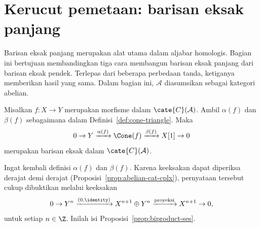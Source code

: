 
\section{Kerucut pemetaan: barisan eksak panjang}\label{sec:cone-vs-long-exact-sequence}
\hypertarget{o014.aljabr2.chapter3.mapping-cone-and-long-exact-sequences}{ }

Barisan eksak panjang merupakan alat utama dalam aljabar homologis. Bagian ini
bertujuan membandingkan tiga cara membangun barisan eksak panjang dari barisan
eksak pendek. Terlepas dari beberapa perbedaan tanda, ketiganya memberikan
hasil yang sama. Dalam bagian ini, $\mathcal{A}$ diasumsikan sebagai kategori
abelian.

\begin{proposisi}\label{prop:cone-triangle-ses}
	Misalkan $f:X\to Y$ merupakan morfisme dalam $\cate{C}(\mathcal{A})$.
	Ambil $\alpha(f)$ dan $\beta(f)$ sebagaimana dalam
	Definisi~\ref{def:cone-triangle}. Maka
	\[ 0 \to Y \xrightarrow{\alpha(f)} \Cone(f) \xrightarrow{\beta(f)} X[1] \to 0 \]
	merupakan barisan eksak dalam $\cate{C}(\mathcal{A})$.
\end{proposisi}

\begin{bukti}
	Ingat kembali definisi $\alpha(f)$ dan $\beta(f)$. Karena keeksakan dapat
	diperiksa derajat demi derajat (Proposisi~\ref{prop:abelian-cat-cplx}),
	pernyataan tersebut cukup dibuktikan melalui keeksakan
	\[ 0 \to Y^n \xrightarrow{(0, \identity)} X^{n+1} \oplus Y^n \xrightarrow{\text{proyeksi}} X^{n+1} \to 0, \]
	untuk setiap $n\in\Z$. Inilah isi Proposisi~\ref{prop:biproduct-ses}.
\end{bukti}

